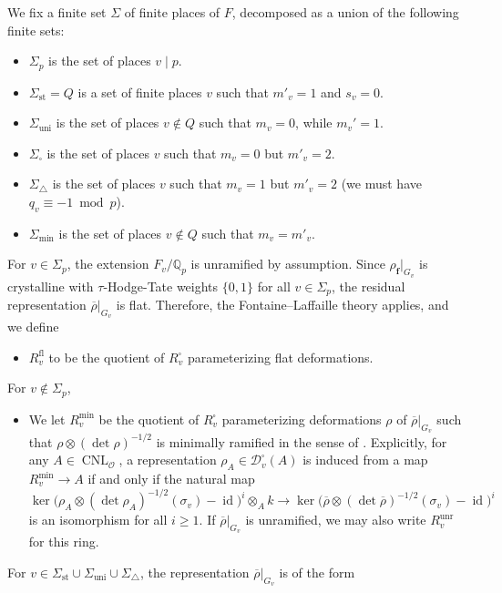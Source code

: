 \documentclass[a4paper, notitlepage, 10pt]{amsart}
\theoremstyle{plain} %
\theoremstyle{definition} %
\theoremstyle{remark} %
\numberwithin{equation}{section}
\newcommand{\CNL}{\operatorname{CNL}}
\newcommand{\id}{\operatorname{id}} %
\newcommand{\uni}{\operatorname{uni}}
\newcommand{\unr}{\operatorname{unr}}
\newcommand{\st}{\operatorname{st}}
\begin{document}
We fix a finite set $\Sigma$ of finite places of $F$, decomposed as a union of the following finite sets:
\begin{itemize}
    \item $\Sigma_p$ is the set of places $v\mid p$.
    \item $\Sigma_{\st}= Q$ is a set of finite places $v$ such that $m'_v=1$ and $s_v=0$.
    \item $\Sigma_{\uni}$ is the set of places $v\not\in Q$ such that $m_v=0$, while $m_v'=1$.
    \item $\Sigma_\square$ is the set of places $v$ such that $m_v=0$ but $m'_v=2$.
      \item $\Sigma_{\triangle}$ is the set of places $v$ such that $m_v=1$ but $m'_v=2$ (we must have $q_v\equiv -1\bmod p$).
     \item $\Sigma_{\text{min}}$ is the set of places $v\not\in Q$ such that $m_v=m'_v$.
\end{itemize}
For $v\in \Sigma_p$, the extension $F_v/\mathbb{Q}_p$ is unramified by assumption. Since $\rho_{\mathbf{f}}|_{G_{v}}$ is crystalline with $\tau$-Hodge-Tate weights $\{0,1\}$ for all $v\in \Sigma_p$, the residual representation $\overline{\rho}|_{G_{v}}$ is flat. Therefore, the Fontaine--Laffaille theory applies, and we define
\begin{itemize}
    \item $R_v^{\text{fl}}$ to be the quotient of $R_v^{\square}$ parameterizing flat deformations.
\end{itemize}
For $v\not\in \Sigma_p$,
\begin{itemize}
    \item We let $R_v^{\min}$ be the quotient of $R_v^{\square}$ parameterizing deformations $\rho$ of  $\overline{\rho}|_{G_v}$ such that $\rho\otimes(\det \rho)^{-1/2}$ is minimally ramified in the sense of \cite[Definition 2.4.14]{CHT}. Explicitly, for any $A\in \CNL_{\mathcal{O}}$, a representation $\rho_A\in \mathcal{D}_v^{\square}(A)$ is induced from a map $R_v^{\min}\to A$ if and only if the natural map
    $$ \ker\big(\rho_A\otimes(\det \rho_A)^{-1/2}(\sigma_v)-\id\big)^i\otimes_A k\longrightarrow \ker\big(\overline{\rho}\otimes(\det \overline{\rho})^{-1/2}(\sigma_v)-\id\big)^i $$
    is an isomorphism for all $i\ge 1.$
    If $\overline{\rho}|_{G_v}$ is unramified, we may also write $R^{\unr}_v$ for this ring.
\end{itemize}
For $v\in \Sigma_{\st}\cup\Sigma_{\uni}\cup \Sigma_{\triangle}$, the representation $\overline{\rho}|_{G_{v}}$ is of the form
\end{document}
